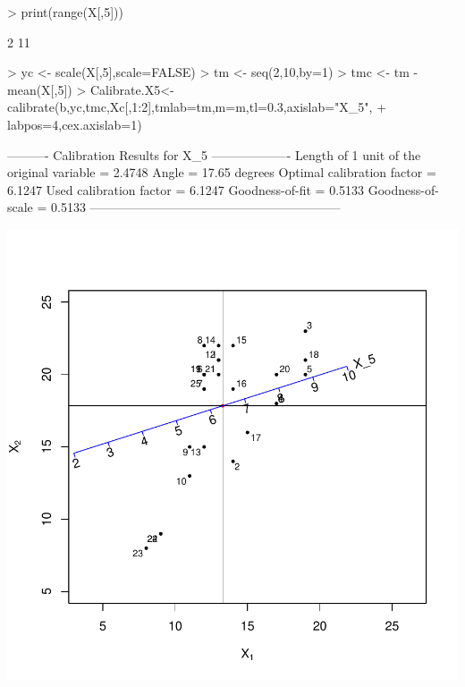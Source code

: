 \documentclass[a4paper]{article}
\begin{document}
\begin{Schunk}
\begin{Sinput}
> print(range(X[,5]))
\end{Sinput}
\begin{Soutput}
[1]  2 11
\end{Soutput}
\begin{Sinput}
> yc <- scale(X[,5],scale=FALSE)
> tm <- seq(2,10,by=1)
> tmc <- tm - mean(X[,5])
> Calibrate.X5<-calibrate(b,yc,tmc,Xc[,1:2],tmlab=tm,m=m,tl=0.3,axislab="X_5",
+                         labpos=4,cex.axislab=1)
\end{Sinput}
\begin{Soutput}
---------- Calibration Results for  X_5  -------------------
Length of 1 unit of the original variable =  2.4748  
Angle                                     =  17.65 degrees
Optimal calibration factor                =  6.1247  
Used calibration factor                   =  6.1247  
Goodness-of-fit                           =  0.5133  
Goodness-of-scale                         =  0.5133  
------------------------------------------------------------
\end{Soutput}
\end{Schunk}
\includegraphics{CalibrationGuide-006}
\end{document}
